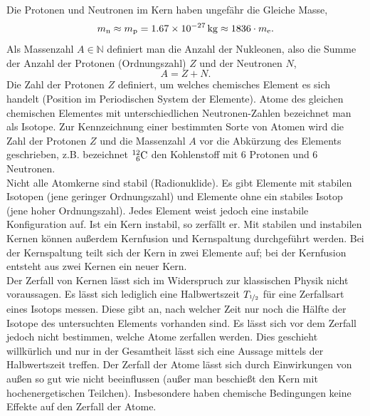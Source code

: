 Die Protonen und Neutronen im Kern haben ungefähr die Gleiche Masse,
\begin{equation}
m_\textrm n \approx m_\textrm p = \SI{1,67E-27}{kg} \approx 1836 \cdot m_\textrm e.
\end{equation}
Als Massenzahl $A \in \mathbb{N}$ definiert man die Anzahl der Nukleonen, also die Summe der Anzahl der Protonen (Ordnungszahl) $Z$ und der Neutronen $N$,
\begin{equation}
A = Z + N.
\end{equation}
Die Zahl der Protonen $Z$ definiert, um welches chemisches Element es sich handelt (Position im Periodischen System der Elemente). Atome des gleichen chemischen Elementes mit unterschiedlichen Neutronen-Zahlen bezeichnet man als Isotope. Zur Kennzeichnung einer bestimmten Sorte von Atomen wird die Zahl der Protonen $Z$ und die Massenzahl $A$ vor die Abkürzung des Elements geschrieben, z.B. bezeichnet $\element{C}{6}{12}$ den Kohlenstoff mit $6$ Protonen und $6$ Neutronen.\\
Nicht alle Atomkerne sind stabil (Radionuklide). Es gibt Elemente mit stabilen Isotopen (jene geringer Ordnungszahl) und Elemente ohne ein stabiles Isotop (jene hoher Ordnungszahl). Jedes Element weist jedoch eine instabile Konfiguration auf. Ist ein Kern instabil, so zerfällt er. Mit stabilen und instabilen Kernen können außerdem Kernfusion und Kernspaltung durchgeführt werden. Bei der Kernspaltung teilt sich der Kern in zwei Elemente auf; bei der Kernfusion entsteht aus zwei Kernen ein neuer Kern.\\
Der Zerfall von Kernen lässt sich im Widerspruch zur klassischen Physik nicht voraussagen. Es lässt sich lediglich eine Halbwertszeit $T_{\nicefrac{1}{2}}$ für eine Zerfallsart eines Isotops messen. Diese gibt an, nach welcher Zeit nur noch die Hälfte der Isotope des untersuchten Elements vorhanden sind. Es lässt sich vor dem Zerfall jedoch nicht bestimmen, welche Atome zerfallen werden. Dies geschieht willkürlich und nur in der Gesamtheit lässt sich eine Aussage mittels der Halbwertszeit treffen. Der Zerfall der Atome lässt sich durch Einwirkungen von außen so gut wie nicht beeinflussen (außer man beschießt den Kern mit hochenergetischen Teilchen). Insbesondere haben chemische Bedingungen keine Effekte auf den Zerfall der Atome.\\

